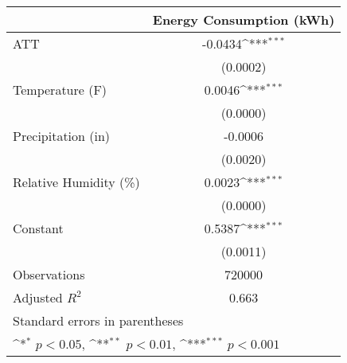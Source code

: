 {
\def\sym#1{\ifmmode^{#1}\else\(^{#1}\)\fi}
\begin{tabular}{l*{1}{c}}
\hline\hline
                    &\multicolumn{1}{c}{Energy Consumption (kWh)}\\
\hline
ATT                 &     -0.0434\sym{***}\\
                    &    (0.0002)         \\
[1em]
Temperature (F)     &      0.0046\sym{***}\\
                    &    (0.0000)         \\
[1em]
Precipitation (in)  &     -0.0006         \\
                    &    (0.0020)         \\
[1em]
Relative Humidity (\%)&      0.0023\sym{***}\\
                    &    (0.0000)         \\
[1em]
Constant            &      0.5387\sym{***}\\
                    &    (0.0011)         \\
\hline
Observations        &      720000         \\
Adjusted \(R^{2}\)  &       0.663         \\
\hline\hline
\multicolumn{2}{l}{\footnotesize Standard errors in parentheses}\\
\multicolumn{2}{l}{\footnotesize \sym{*} \(p<0.05\), \sym{**} \(p<0.01\), \sym{***} \(p<0.001\)}\\
\end{tabular}
}
